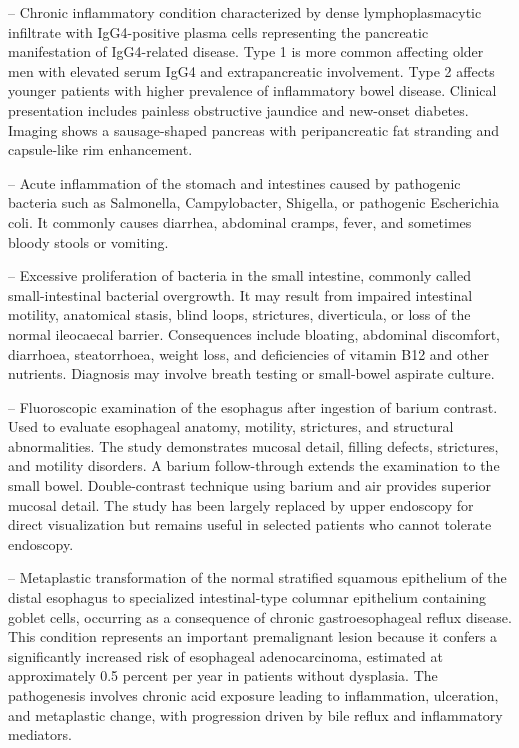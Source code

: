 -- Chronic inflammatory condition characterized by dense lymphoplasmacytic infiltrate with IgG4-positive plasma cells representing the pancreatic manifestation of IgG4-related disease. Type 1 is more common affecting older men with elevated serum IgG4 and extrapancreatic involvement. Type 2 affects younger patients with higher prevalence of inflammatory bowel disease. Clinical presentation includes painless obstructive jaundice and new-onset diabetes. Imaging shows a sausage-shaped pancreas with peripancreatic fat stranding and capsule-like rim enhancement.

-- Acute inflammation of the stomach and intestines caused by pathogenic bacteria such as Salmonella, Campylobacter, Shigella, or pathogenic Escherichia coli. It commonly causes diarrhea, abdominal cramps, fever, and sometimes bloody stools or vomiting.

-- Excessive proliferation of bacteria in the small intestine, commonly called small-intestinal bacterial overgrowth. It may result from impaired intestinal motility, anatomical stasis, blind loops, strictures, diverticula, or loss of the normal ileocaecal barrier. Consequences include bloating, abdominal discomfort, diarrhoea, steatorrhoea, weight loss, and deficiencies of vitamin B12 and other nutrients. Diagnosis may involve breath testing or small-bowel aspirate culture.

-- Fluoroscopic examination of the esophagus after ingestion of barium contrast. Used to evaluate esophageal anatomy, motility, strictures, and structural abnormalities. The study demonstrates mucosal detail, filling defects, strictures, and motility disorders. A barium follow-through extends the examination to the small bowel. Double-contrast technique using barium and air provides superior mucosal detail. The study has been largely replaced by upper endoscopy for direct visualization but remains useful in selected patients who cannot tolerate endoscopy.

-- Metaplastic transformation of the normal stratified squamous epithelium of the distal esophagus to specialized intestinal-type columnar epithelium containing goblet cells, occurring as a consequence of chronic gastroesophageal reflux disease. This condition represents an important premalignant lesion because it confers a significantly increased risk of esophageal adenocarcinoma, estimated at approximately 0.5 percent per year in patients without dysplasia. The pathogenesis involves chronic acid exposure leading to inflammation, ulceration, and metaplastic change, with progression driven by bile reflux and inflammatory mediators.

